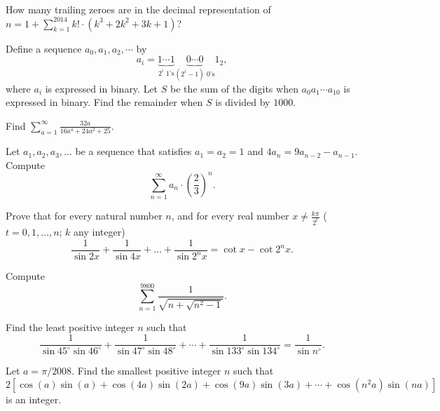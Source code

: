 \documentclass[mast]{lucky}
\begin{document}
\begin{prob}{6}
How many trailing zeroes are in the decimal representation of $n=1+\sum_{k=1}^{2014} k!\cdot (k^3+2k^2+3k+1)$?
\end{prob}

\begin{prob}[CIME I 2020/12]{6}
Define a sequence $a_0,a_1,a_2,\cdots$ by
\[a_i=\underbrace{1\cdots 1}_{2^i \text{ 1's}} \underbrace{0\cdots 0}_{(2^i-1) \text{ 0's}} 1_2,\]
where $a_i$ is expressed in binary. Let $S$ be the sum of the digits when $a_0a_1\cdots a_{10}$ is expressed in binary. Find the remainder when $S$ is divided by $1000.$
\end{prob}

\begin{req}{6}
Find $\sum\limits_{a=1}^{\infty}\frac{32a}{16a^4+24a^2+25}.$
\end{req}

\begin{prob}[NARML 5]{6}
Let $a_1,a_2,a_3,\ldots$ be a sequence that satisfies $a_1=a_2=1$ and $4a_n=9a_{n-2}-a_{n-1}.$ Compute
\[\sum_{n=1}^{\infty}a_n\cdot \left(\frac{2}{3}\right)^n.\]
\end{prob}

\begin{prob}[IMO 1966/4]{6}
Prove that for every natural number $n$, and for every real number $x \neq \frac{k\pi}{2^t}$ ($t=0,1, \dots, n$; $k$ any integer)
\[\frac{1}{\sin{2x}}+\frac{1}{\sin{4x}}+\dots+\frac{1}{\sin{2^nx}}=\cot{x}-\cot{2^nx}.\]
\end{prob}

\begin{prob}{9}
Compute \[\sum_{n = 1}^{9800} \frac{1}{\sqrt{n + \sqrt{n^2 - 1}}}.\]
\end{prob}


\begin{prob}[AIME II 2000/15]{9}
Find the least positive integer $n$ such that
\[\frac 1{\sin 45^\circ\sin 46^\circ}+\frac 1{\sin 47^\circ\sin 48^\circ}+\cdots+\frac 1{\sin 133^\circ\sin 134^\circ}=\frac 1{\sin n^\circ}.\]
\end{prob}

\begin{prob}[AIME II 2008/8]{13}
Let $a = \pi/2008$. Find the smallest positive integer $n$ such that\[2[\cos(a)\sin(a) + \cos(4a)\sin(2a) + \cos(9a)\sin(3a) + \cdots + \cos(n^2a)\sin(na)]\]is an integer.
\end{prob}
\end{document}

